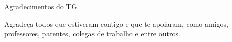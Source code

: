 \begin{agradecimentos}
\par Agradecimentos do TG.
\par Agradeça todos que estiveram contigo e que te apoiaram, como amigos, professores, parentes, colegas de trabalho e entre outros.
\end{agradecimentos}